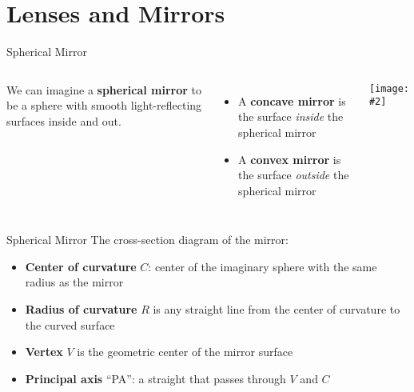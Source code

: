 \documentclass[12pt,compress,aspectratio=169]{beamer}
\newcommand{\pic}[2]{\texttt{[image: \#2]}}
\begin{document}
\section{Lenses and Mirrors}

\begin{frame}{Spherical Mirror}
  \begin{columns}
    We can imagine a \textbf{spherical mirror} to be a sphere with smooth
    light-reflecting surfaces inside and out.
    \begin{itemize}
    \item A \textbf{concave mirror} is the surface \emph{inside} the spherical
      mirror
    \item A \textbf{convex mirror} is the surface \emph{outside} the spherical
      mirror
    \end{itemize}
    \pic{1}{graphics/spherical-mirror}
  \end{columns}
\end{frame}



\begin{frame}{Spherical Mirror}
  The cross-section diagram of the mirror:
  \begin{center}
  \end{center}
  \begin{itemize}
  \item\textbf{Center of curvature} $C$: center of the imaginary sphere
    with the same radius as the mirror
  \item\textbf{Radius of curvature} $R$ is any straight line from the
    center of curvature to the curved surface
  \item\textbf{Vertex} $V$ is the geometric center of the mirror surface
  \item\textbf{Principal axis} ``PA'': a straight that passes through $V$ and
    $C$
  \end{itemize}
\end{frame}
\end{document}
